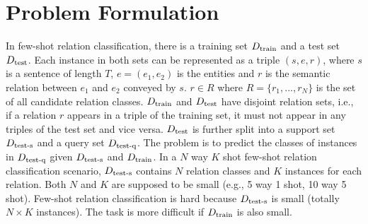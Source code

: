 \section{Problem Formulation}
In few-shot relation classification, there is a training set 
$D_{\rm{train}}$ and a test set $D_{\rm{test}}$. 
Each instance in both sets can be represented as a triple $(s,e,r)$, 
where $s$ is a sentence of length $T$, $e=(e_1, e_2)$ is the entities and 
$r$ is the semantic relation between $e_1$ and $e_2$ conveyed by $s$.
$r \in R$ where $R=\{r_1,...,r_N\}$ is the set of all candidate relation classes.
$D_{\rm{train}}$ and $D_{\rm{test}}$ have disjoint relation sets, i.e., 
if a relation $r$ appears in a triple of the training set, it must not appear 
in any triples of the test set and vice versa.
$D_{\rm{test}}$ is further split into a support set $D_{\rm{test\text{-}s}}$ 
and a query set $D_{\rm{test\text{-}q}}$. The problem is to predict 
the classes of instances in $D_{\rm{test\text{-}q}}$ given 
$D_{\rm{test\text{-}s}}$ and $D_{\rm{train}}$.
In a $N$ way $K$ shot few-shot relation classification scenario, 
$D_{\rm{test\text{-}s}}$ contains $N$ relation classes and $K$ instances 
for each relation. Both $N$ and $K$ are supposed to be small (e.g., 5 way 1 shot, 10 way 5 shot). Few-shot relation classification is hard because 
$D_{\rm{test\text{-}s}}$ is small (totally $N\times K$ instances).
The task is more difficult if $D_{\rm{train}}$ is also small.
